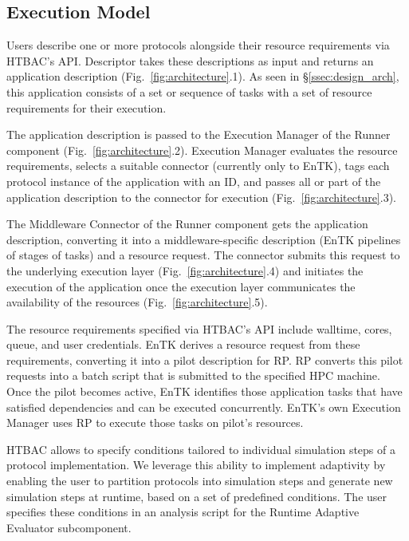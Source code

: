 \subsection{Execution Model}\label{ssec:adaptive_execution}

Users describe one or more protocols alongside their
resource requirements via HTBAC's API. Descriptor takes these descriptions as
input and returns an application description (Fig.~\ref{fig:architecture}.1).
As seen in \S\ref{ssec:design_arch}, this application consists of a set or
sequence of tasks with a set of resource requirements for their execution.

The application description is passed to the Execution Manager of the Runner
component (Fig.~\ref{fig:architecture}.2). Execution Manager evaluates the
resource requirements, selects a suitable connector (currently only to EnTK),
tags each protocol instance of the application with an ID, and passes all or
part of the application description to the connector for execution
(Fig.~\ref{fig:architecture}.3).

The Middleware Connector of the Runner component gets the application
description, converting it into a middleware-specific description (EnTK
pipelines of stages of tasks) and a resource request. The connector submits
this request to the underlying execution layer
(Fig.~\ref{fig:architecture}.4) and initiates the execution of the
application once the execution layer communicates the availability of the
resources (Fig.~\ref{fig:architecture}.5).

The resource requirements specified via HTBAC's API include walltime, cores,
queue, and user credentials. EnTK derives a resource request from these
requirements, converting it into a pilot description for RP. RP converts this
pilot requests into a batch script that is submitted to the specified HPC
machine. Once the pilot becomes active, EnTK identifies those application
tasks that have satisfied dependencies and can be executed concurrently.
EnTK's own Execution Manager uses RP to execute those tasks on pilot's
resources.

HTBAC allows to specify conditions tailored to individual simulation steps of
a protocol implementation. We leverage this ability to implement adaptivity
by enabling the user to partition protocols into simulation steps and
generate new simulation steps at runtime, based on a set of predefined
conditions. The user specifies these conditions in an analysis script for the
Runtime Adaptive Evaluator subcomponent.

